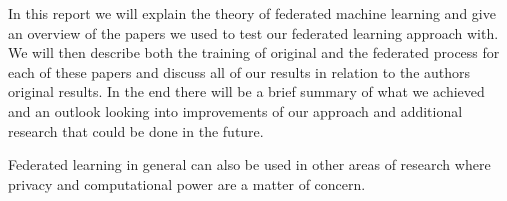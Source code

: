 In this report we will explain the theory of federated machine learning and give an overview of the papers we used to test our federated learning approach with. We will then describe both the training of original and the federated process for each of these papers and discuss all of our results in relation to the authors original results. In the end there will be a brief summary of what we achieved and an outlook looking into improvements of our approach and additional research that could be done in the future.

Federated learning in general can also be used in other areas of research where privacy and computational power are a matter of concern.
